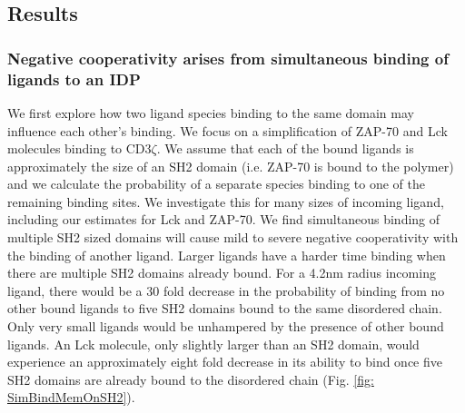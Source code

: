 \documentclass[../../AdvancementSummary.tex]{subfiles}
\begin{document}

\subsection{Results}

\subsubsection{Negative cooperativity arises from simultaneous binding of ligands to an IDP}

We first explore how two ligand species binding to the same domain may influence each other's binding. We focus on a simplification of ZAP-70 and Lck molecules binding to CD3$\zeta$. We assume that each of the bound ligands is approximately the size of an SH2 domain (i.e. ZAP-70 is bound to the polymer) and we calculate the probability of a separate species binding to one of the remaining binding sites. We investigate this for many sizes of incoming ligand, including our estimates for Lck and ZAP-70. We find simultaneous binding of multiple SH2 sized domains will cause mild to severe negative cooperativity with the binding of another ligand. Larger ligands have a harder time binding when there are multiple SH2 domains already bound. For a 4.2nm radius incoming ligand, there would be a 30 fold decrease in the probability of binding from no other bound ligands to five SH2 domains bound to the same disordered chain. Only very small ligands would be unhampered by the presence of other bound ligands. An Lck molecule, only slightly larger than an SH2 domain, would experience an approximately eight fold decrease in its ability to bind once five SH2 domains are already bound to the disordered chain (Fig. \ref{fig: SimBindMemOnSH2}).
\end{document}
